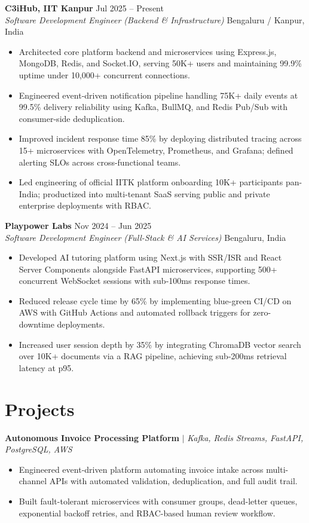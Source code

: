 \documentclass[10pt]{article}
\newcommand{\rItemList}{\begin{itemize}[leftmargin=1.1em, itemsep=0.8pt, topsep=0.8pt, parsep=0pt, label=\textbullet]}
\newcommand{\rEndItemList}{\end{itemize}}
\begin{document}
\textbf{C3iHub, IIT Kanpur} \hfill Jul 2025 -- Present \\
\textit{Software Development Engineer (Backend \& Infrastructure)} \hfill Bengaluru / Kanpur, India
\rItemList
\item Architected core platform backend and microservices using Express.js, MongoDB, Redis, and Socket.IO, serving 50K+ users and maintaining 99.9\% uptime under 10,000+ concurrent connections.
\item Engineered event-driven notification pipeline handling 75K+ daily events at 99.5\% delivery reliability using Kafka, BullMQ, and Redis Pub/Sub with consumer-side deduplication.
\item Improved incident response time 85\% by deploying distributed tracing across 15+ microservices with OpenTelemetry, Prometheus, and Grafana; defined alerting SLOs across cross-functional teams.
\item Led engineering of official IITK platform onboarding 10K+ participants pan-India; productized into multi-tenant SaaS serving public and private enterprise deployments with RBAC.
\rEndItemList

\textbf{Playpower Labs} \hfill Nov 2024 -- Jun 2025 \\
\textit{Software Development Engineer (Full-Stack \& AI Services)} \hfill Bengaluru, India
\rItemList
\item Developed AI tutoring platform using Next.js with SSR/ISR and React Server Components alongside FastAPI microservices, supporting 500+ concurrent WebSocket sessions with sub-100ms response times.
\item Reduced release cycle time by 65\% by implementing blue-green CI/CD on AWS with GitHub Actions and automated rollback triggers for zero-downtime deployments.
\item Increased user session depth by 35\% by integrating ChromaDB vector search over 10K+ documents via a RAG pipeline, achieving sub-200ms retrieval latency at p95.
\rEndItemList

\section{Projects}

\textbf{Autonomous Invoice Processing Platform} $\vert$ \textit{Kafka, Redis Streams, FastAPI, PostgreSQL, AWS} \\
\rItemList
\item Engineered event-driven platform automating invoice intake across multi-channel APIs with automated validation, deduplication, and full audit trail.
\item Built fault-tolerant microservices with consumer groups, dead-letter queues, exponential backoff retries, and RBAC-based human review workflow.
\rEndItemList
\end{document}

